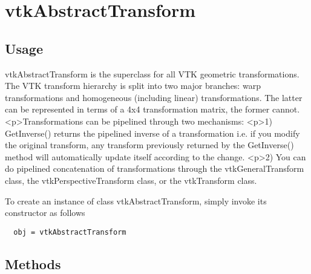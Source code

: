\section{vtkAbstractTransform}

\subsection{Usage}

 vtkAbstractTransform is the superclass for all VTK geometric 
 transformations.  The VTK transform hierarchy is split into two
 major branches: warp transformations and homogeneous (including linear)
 transformations.  The latter can be represented in terms of a 4x4
 transformation matrix, the former cannot.  
 <p>Transformations can be pipelined through two mechanisms:  
 <p>1) GetInverse() returns the pipelined
 inverse of a transformation i.e. if you modify the original transform,
 any transform previously returned by the GetInverse() method will
 automatically update itself according to the change.
 <p>2) You can do pipelined concatenation of transformations through 
 the vtkGeneralTransform class, the vtkPerspectiveTransform class,
 or the vtkTransform class. 

To create an instance of class vtkAbstractTransform, simply
invoke its constructor as follows
\begin{verbatim}
  obj = vtkAbstractTransform
\end{verbatim}
\subsection{Methods}

